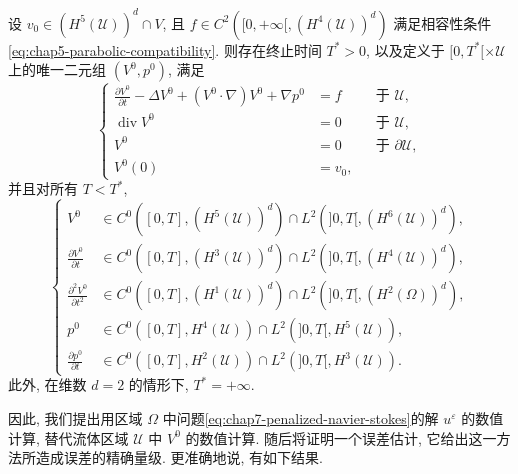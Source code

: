 \begin{sloppypar}
\begin{Proposition}
\label{prop:chap7-limit-fluid-strong-solution}
设 $v_0\in(H^5(\mathcal U))^d\cap V$, 且
$f\in C^2([0,+\infty[,(H^4(\mathcal U))^d)$ 满足相容性条件\eqref{eq:chap5-parabolic-compatibility}. 则存在终止时间 $T^*>0$, 以及定义于 $[0,T^*[\times\mathcal U$ 上的唯一二元组 $(V^0,p^0)$, 满足
\[
\left\{
\begin{aligned}
 \frac{\partial V^0}{\partial t}-\Delta V^0+(V^0\cdot\nabla)V^0+\nabla p^0&=f
 &&\text{于 }\mathcal U,\\
 \operatorname{div}V^0&=0&&\text{于 }\mathcal U,\\
 V^0&=0&&\text{于 }\partial\mathcal U,\\
 V^0(0)&=v_0,
\end{aligned}
\right.
\]
并且对所有 $T<T^*$,
\begin{equation}
\left\{
\begin{aligned}
 V^0&\in C^0([0,T],(H^5(\mathcal U))^d)
 \cap L^2(]0,T[,(H^6(\mathcal U))^d),\\
 \frac{\partial V^0}{\partial t}&\in C^0([0,T],(H^3(\mathcal U))^d)
 \cap L^2(]0,T[,(H^4(\mathcal U))^d),\\
 \frac{\partial^2V^0}{\partial t^2}&\in C^0([0,T],(H^1(\mathcal U))^d)
 \cap L^2(]0,T[,(H^2(\Omega))^d),\\
 p^0&\in C^0([0,T],H^4(\mathcal U))
 \cap L^2(]0,T[,H^5(\mathcal U)),\\
 \frac{\partial p^0}{\partial t}&\in C^0([0,T],H^2(\mathcal U))
 \cap L^2(]0,T[,H^3(\mathcal U)).
\end{aligned}
\right.
\label{eq:chap7-limit-fluid-regularity}
\end{equation}
此外, 在维数 $d=2$ 的情形下, $T^*=+\infty$.
\end{Proposition}

因此, 我们提出用区域 $\Omega$ 中问题\eqref{eq:chap7-penalized-navier-stokes}的解 $u^\varepsilon$ 的数值计算, 替代流体区域 $\mathcal U$ 中 $V^0$ 的数值计算. 随后将证明一个误差估计, 它给出这一方法所造成误差的精确量级. 更准确地说, 有如下结果.


\end{sloppypar}
